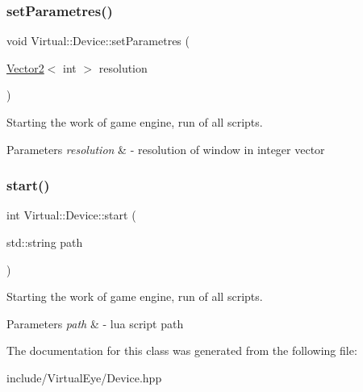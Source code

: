 \subsubsection{\texorpdfstring{set\+Parametres()}{setParametres()}}
{\footnotesize\ttfamily void Virtual\+::\+Device\+::set\+Parametres (\begin{DoxyParamCaption}\item[{\hyperlink{struct_virtual_1_1_vector2}{Vector2}$<$ int $>$}]{resolution }\end{DoxyParamCaption})\hspace{0.3cm}{\ttfamily [protected]}}



Starting the work of game engine, run of all scripts. 


\begin{DoxyParams}{Parameters}
{\em resolution} & -\/ resolution of window in integer vector \\
\hline
\end{DoxyParams}
\hypertarget{class_virtual_1_1_device_aaadbfd2dd970af7a42a858ee52d36869}{}\label{class_virtual_1_1_device_aaadbfd2dd970af7a42a858ee52d36869} 
\subsubsection{\texorpdfstring{start()}{start()}}
{\footnotesize\ttfamily int Virtual\+::\+Device\+::start (\begin{DoxyParamCaption}\item[{std\+::string}]{path }\end{DoxyParamCaption})}



Starting the work of game engine, run of all scripts. 


\begin{DoxyParams}{Parameters}
{\em path} & -\/ lua script path \\
\hline
\end{DoxyParams}


The documentation for this class was generated from the following file\+:\begin{DoxyCompactItemize}
\item 
include/\+Virtual\+Eye/Device.\+hpp\end{DoxyCompactItemize}
